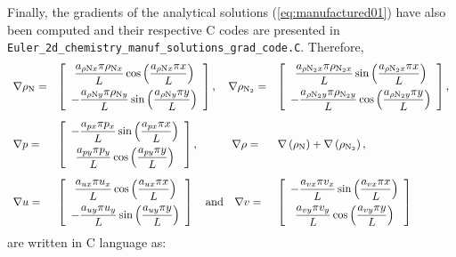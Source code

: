 \documentclass[10pt]{article}
\begin{document}
Finally, the gradients of the analytical solutions (\ref{eq:manufactured01}) have also been computed and their respective C codes are presented in  \texttt{Euler\_2d\_chemistry\_manuf\_solutions\_grad\_code.C}. Therefore,
\begin{equation}
\begin{array}{lll}
\nabla \rho_{\text{N}} =& \left[ \begin{array}{c}
 \dfrac{ a_{ \rho \text{N} x} \pi \rho_{\text{N}x} }{L} \cos\left( \dfrac{ a_{\rho \text{N} x} \pi x }{L}\right) \vspace{5pt}\\
 -\dfrac{ a_{ \rho \text{N} y} \pi \rho_{\text{N} y} }{L} \sin\left( \dfrac{ a_{ \rho \text{N} y} \pi y }{L}\right)
\end{array} \right],
\quad
\nabla \rho_{\text{N}_2} =& \left[ \begin{array}{c}
 \dfrac{ a_{ \rho \text{N}_2 x} \pi \rho_{\text{N}_2 x} }{L} \sin\left( \dfrac{ a_{ \rho \text{N}_2 x} \pi x }{L}\right) \vspace{5pt}\\
-\dfrac{ a_{ \rho \text{N}_2 y} \pi \rho_{\text{N}_2 y} }{L} \cos\left( \dfrac{ a_{ \rho \text{N}_2 y} \pi y }{L}\right)
\end{array} \right], \vspace{10pt} \\
%
\nabla p =& \left[ \begin{array}{c}
- \dfrac{ a_{px} \pi p_x }{L} \sin\left( \dfrac{ a_{px} \pi x }{L}\right) \vspace{5pt}\\
 \dfrac{ a_{py} \pi p_y }{L} \cos\left( \dfrac{ a_{py} \pi y }{L}\right)
\end{array} \right],
\quad\quad \quad
\nabla \rho =&\nabla \left( \rho_\text{N}\right) + \nabla \left(\rho_{\text{N}_2} \right), \vspace{10pt} \\
%
\nabla u =& \left[ \begin{array}{c}
\dfrac{ a_{ux} \pi u_x}{L} \cos\left( \dfrac{ a_{ux} \pi x }{L}\right)\vspace{5pt} \\
- \dfrac{ a_{uy} \pi u_y }{L} \sin\left( \dfrac{ a_{uy} \pi y }{L}\right)
\end{array} \right]
\quad \mbox{and} \quad
\nabla v =& \left[ \begin{array}{c}
- \dfrac{ a_{vx} \pi v_x }{L} \sin\left( \dfrac{ a_{vx} \pi x }{L}\right)\vspace{5pt} \\
 \dfrac{ a_{vy} \pi v_y }{L} \cos\left( \dfrac{ a_{vy} \pi y }{L}\right)
\end{array} \right]
\end{array}
\end{equation}
are written in C language as:
\end{document}
